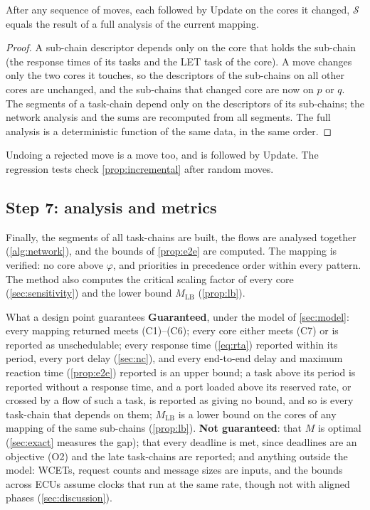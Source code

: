 \begin{proposition}[Exactness]
\label{prop:incremental}
After any sequence of moves, each followed by \textsf{Update} on the cores
it changed, $\mathcal{S}$ equals the result of a full analysis of the
current mapping.
\end{proposition}
\begin{proof}
A sub-chain descriptor depends only on the core that holds the sub-chain
(the response times of its tasks and the LET task of the core). A move
changes only the two cores it touches, so the descriptors of the
sub-chains on all other cores are unchanged, and the sub-chains that
changed core are now on $p$ or $q$. The segments of a task-chain depend only
on the descriptors of its sub-chains; the network analysis and the sums are
recomputed from all segments. The full analysis is a deterministic function
of the same data, in the same order.
\end{proof}
Undoing a rejected move is a move too, and is followed by \textsf{Update}.
The regression tests check \cref{prop:incremental} after random moves.

\subsection{Step 7: analysis and metrics}

Finally, the segments of all task-chains are built, the flows are analysed
together (\cref{alg:network}), and the bounds of \cref{prop:e2e} are
computed. The mapping is verified: no core above $\varphi$, and priorities
in precedence order within every pattern. The method also computes the
critical scaling factor of every core
(\cref{sec:sensitivity}) and the lower bound $M_{\mathrm{LB}}$
(\cref{prop:lb}).

\begin{keybox}{What a design point guarantees}
\textbf{Guaranteed}, under the model of \cref{sec:model}: every mapping
returned meets (C1)--(C6); every core either meets (C7) or is reported as
unschedulable; every response time (\cref{eq:rta}) reported within its
period, every port delay (\cref{sec:nc}), and every end-to-end delay and
maximum reaction time (\cref{prop:e2e}) reported is an upper bound; a
task above its period is reported without a response time, and a port
loaded above its reserved rate, or crossed by a flow of such a task, is
reported as giving no bound, and so is every task-chain that depends on
them; $M_{\mathrm{LB}}$ is a lower
bound on the cores of any mapping of the same sub-chains
(\cref{prop:lb}).
\textbf{Not guaranteed}: that $M$ is optimal (\cref{sec:exact} measures
the gap); that every deadline is met, since deadlines are an objective
(O2) and the late task-chains are reported; and anything outside the
model: WCETs, request counts and message sizes are inputs, and the
bounds across ECUs assume clocks that run at the same rate, though not
with aligned phases (\cref{sec:discussion}).
\end{keybox}

